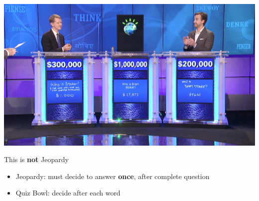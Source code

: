 \documentclass[compress]{beamer}
\begin{document}
\begin{frame}[plain]
  \vspace{-2cm}
		\includegraphics[width=1.0\linewidth]{qb/jeopardy}
                \pause
                \vspace{-8cm}
         \begin{block}{This is {\bf not} Jeopardy}
		\begin{itemize}
                        \item Jeopardy: must decide to answer {\bf once}, after
                          complete question
                        \item Quiz Bowl: decide after each word
		\end{itemize}

	\end{block}

\end{frame}




\end{document}
